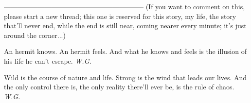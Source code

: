 --------------------------------------------------------------
(If you want to comment on this, please start a new thread; this one is reserved for this story, my life, the story that'll never end, while the end is still near, coming nearer every minute; it's just around the corner...)

An hermit 
knows. 
An hermit 
feels. 
And what he knows and feels 
is the illusion 
of his life 
he can't escape. 
\emph{W.G.}

Wild 
is the course of nature 
and life. 
Strong 
is the wind 
that leads our lives. 
And the only control there is, 
the only reality there'll ever be, 
is the rule of chaos. 
\emph{W.G.}
